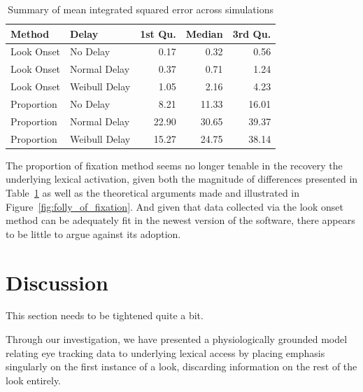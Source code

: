 \begin{table}[H]
\centering
\begin{tabular}{llrrr}
  \hline
Method & Delay & 1st Qu. & Median & 3rd Qu. \\ 
  \hline
Look Onset & No Delay & 0.17 & 0.32 & 0.56 \\ 
  Look Onset & Normal Delay & 0.37 & 0.71 & 1.24 \\ 
  Look Onset & Weibull Delay & 1.05 & 2.16 & 4.23 \\ 
  Proportion & No Delay & 8.21 & 11.33 & 16.01 \\ 
  Proportion & Normal Delay & 22.90 & 30.65 & 39.37 \\ 
  Proportion & Weibull Delay & 15.27 & 24.75 & 38.14 \\ 
   \hline
\end{tabular}
\caption{Summary of mean integrated squared error across simulations}
\label{tab:mise_sims}
\end{table}

The proportion of fixation method seems no longer tenable in the recovery the underlying lexical activation, given both the magnitude of differences presented in Table~\ref{tab:mise_sims} as well as the theoretical arguments made and illustrated in Figure~\ref{fig:folly_of_fixation}. And given that data collected via the look onset method can be adequately fit in the newest version of the  software, there appears to be little to argue against its adoption.


\section{Discussion}

This section needs to be tightened quite a bit.

Through our investigation, we have presented a physiologically grounded model relating eye tracking data to underlying lexical access by placing emphasis singularly on the first instance of a look, discarding information on the rest of the look entirely. 

